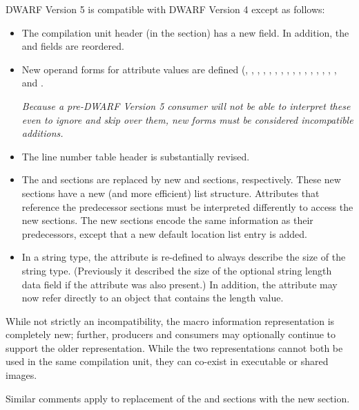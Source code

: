 DWARF Version 5 is compatible with DWARF Version 4 except as follows:
\begin{itemize}
\item The compilation unit header (in the \dotdebuginfo{} section) has
a new \HFNunittype{} field.
In addition, the \HFNdebugabbrevoffset{} and \HFNaddresssize{} fields are reordered.
\item New operand forms for attribute values are defined 
(\DWFORMaddrxNAME, 
\DWFORMaddrxoneNAME, \DWFORMaddrxtwoNAME, \DWFORMaddrxthreeNAME, \DWFORMaddrxfourNAME, 
\DWFORMdatasixteenNAME, \DWFORMimplicitconstNAME, 
\DWFORMlinestrpNAME,
\DWFORMloclistxNAME, \DWFORMrnglistxNAME,
\DWFORMrefsupfourNAME, \DWFORMrefsupeightNAME, 
\DWFORMstrpsupNAME, \DWFORMstrxNAME, 
\DWFORMstrxoneNAME, \DWFORMstrxtwoNAME, \DWFORMstrxthreeNAME{} and \DWFORMstrxfourNAME.

\textit{Because a pre-DWARF Version 5 consumer will not be able to interpret 
these even to ignore and skip over them, new forms must be 
considered incompatible additions.}
\item The line number table header is substantially revised.
\item 
The \dotdebugloc{} and \dotdebugranges{} sections are replaced
by new \dotdebugloclists{} and \dotdebugrnglists{} sections, respectively.
These new sections have a new (and more efficient) list structure.
Attributes that reference the predecessor sections must be interpreted
differently to access the new sections. The new sections encode the same
information as their predecessors, except that a new default location 
list entry is added. 
\item In a string type, the \DWATbytesizeNAME{} attribute is re-defined 
to always describe the size of the string type. 
(Previously it described the size of the optional string length data 
field if the \DWATstringlengthNAME{} attribute was also present.)
In addition, the \DWATstringlengthNAME{} attribute may now refer directly
to an object that contains the length value.
\end{itemize}

While not strictly an incompatibility, the macro information 
representation is completely new; further, producers 
and consumers may optionally continue to support the older 
representation. While the two representations cannot both be 
used in the same compilation unit, they can co-exist in 
executable or shared images.

Similar comments apply to replacement of the \dotdebugpubnames{} 
and \dotdebugpubtypes{} sections with the new \dotdebugnames{} 
section.

